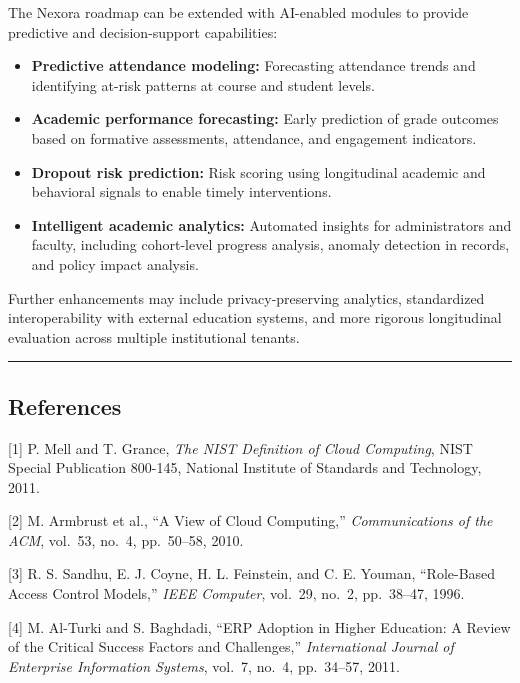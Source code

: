 \documentclass[11pt]{article}
\providecommand{\tightlist}{%
  \setlength{\itemsep}{0pt}\setlength{\parskip}{0pt}}
\begin{document}
The Nexora roadmap can be extended with AI-enabled modules to provide
predictive and decision-support capabilities:

\begin{itemize}
\tightlist
\item
  \textbf{Predictive attendance modeling:} Forecasting attendance trends
  and identifying at-risk patterns at course and student levels.
\item
  \textbf{Academic performance forecasting:} Early prediction of grade
  outcomes based on formative assessments, attendance, and engagement
  indicators.
\item
  \textbf{Dropout risk prediction:} Risk scoring using longitudinal
  academic and behavioral signals to enable timely interventions.
\item
  \textbf{Intelligent academic analytics:} Automated insights for
  administrators and faculty, including cohort-level progress analysis,
  anomaly detection in records, and policy impact analysis.
\end{itemize}

Further enhancements may include privacy-preserving analytics,
standardized interoperability with external education systems, and more
rigorous longitudinal evaluation across multiple institutional tenants.

\begin{center}\rule{0.5\linewidth}{0.5pt}\end{center}

\subsection{References}\label{references}

[1] P. Mell and T. Grance, \emph{The NIST Definition of Cloud
Computing}, NIST Special Publication 800-145, National Institute of
Standards and Technology, 2011.

{[}2{]} M. Armbrust et al., ``A View of Cloud Computing,''
\emph{Communications of the ACM}, vol.~53, no.~4, pp.~50--58, 2010.

{[}3{]} R. S. Sandhu, E. J. Coyne, H. L. Feinstein, and C. E. Youman,
``Role-Based Access Control Models,'' \emph{IEEE Computer}, vol.~29,
no.~2, pp.~38--47, 1996.

{[}4{]} M. Al-Turki and S. Baghdadi, ``ERP Adoption in Higher Education:
A Review of the Critical Success Factors and Challenges,''
\emph{International Journal of Enterprise Information Systems}, vol.~7,
no.~4, pp.~34--57, 2011.
\end{document}
